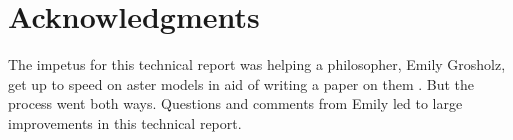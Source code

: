 \documentclass[11pt]{article}
\begin{document}
\section*{Acknowledgments}

The impetus for this technical report was helping a philosopher,
Emily Grosholz, get up to speed on aster models in aid of writing a paper
on them \citep{grosholz}.  But the process went both ways.  Questions and
comments from Emily led to large improvements in this technical report.


\end{document}
